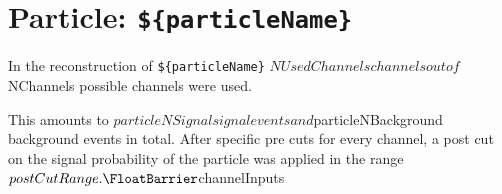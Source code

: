 \FloatBarrier
\clearpage
\cprotect\section{Particle: \verb|${particleName}|}
In the reconstruction of \verb|${particleName}| ${NUsedChannels} channels out of ${NChannels} possible channels were used.
This amounts to ${particleNSignal} signal events and ${particleNBackground} background events in total.
After specific pre cuts for every channel, a post cut on the signal probability of the particle was applied in the range ${postCutRange}.
\FloatBarrier
${channelInputs}
\FloatBarrier
